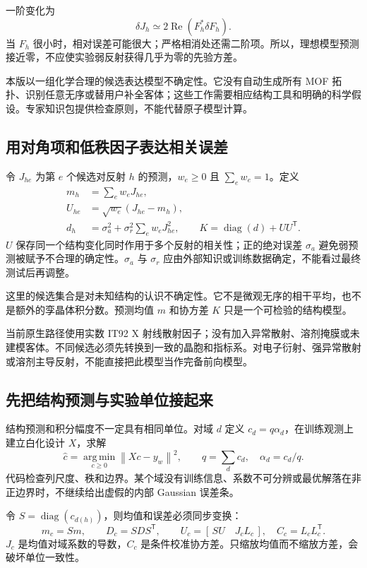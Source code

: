 \documentclass[UTF8,11pt,a4paper,fontset=fandol]{ctexart}
\newcommand{\T}{^{\mathsf T}}
\newcommand{\diag}{\operatorname{diag}}
\newcommand{\norm}[1]{\left\lVert#1\right\rVert}
\newcommand{\argmin}{\operatorname*{arg\,min}}
\begin{document}
一阶变化为
\begin{equation}
 \delta J_h\simeq 2\operatorname{Re}(F_h^*\delta F_h).
\end{equation}
当 $F_h$ 很小时，相对误差可能很大；严格相消处还需二阶项。所以，理想模型预测接近零，不应使实验弱反射获得几乎为零的先验方差。

本版以一组化学合理的候选表达模型不确定性。它没有自动生成所有 MOF 拓扑、识别任意无序或替用户补全客体；这些工作需要相应结构工具和明确的科学假设。专家知识包提供检查原则，不能代替原子模型计算。

\subsection{用对角项和低秩因子表达相关误差}

令 $J_{he}$ 为第 $e$ 个候选对反射 $h$ 的预测，$w_e\geq0$ 且 $\sum_e w_e=1$。定义
\begin{align}
 m_h&=\sum_e w_eJ_{he},\\
 U_{he}&=\sqrt{w_e}(J_{he}-m_h),\\
 d_h&=\sigma_a^2+\sigma_r^2\sum_e w_eJ_{he}^2,\qquad
 K=\diag(d)+UU\T.
\end{align}
$U$ 保存同一个结构变化同时作用于多个反射的相关性；正的绝对误差 $\sigma_a$ 避免弱预测被赋予不合理的确定性。$\sigma_a$ 与 $\sigma_r$ 应由外部知识或训练数据确定，不能看过最终测试后再调整。

这里的候选集合是对未知结构的认识不确定性。它不是微观无序的相干平均，也不是额外的孪晶体积分数。预测均值 $m$ 和协方差 $K$ 只是一个可检验的结构模型。

当前原生路径使用实数 IT92 X 射线散射因子；没有加入异常散射、溶剂掩膜或未建模客体。不同候选必须先转换到一致的晶胞和指标系。对电子衍射、强异常散射或溶剂主导反射，不能直接把此模型当作完备前向模型。

\subsection{先把结构预测与实验单位接起来}

结构预测和积分幅度不一定具有相同单位。对域 $d$ 定义 $c_d=q\alpha_d$，在训练观测上建立白化设计 $X$，求解
\begin{equation}
 \widehat c=\argmin_{c\geq0}\norm{Xc-y_w}^2,\qquad
 q=\sum_dc_d,\quad\alpha_d=c_d/q.
\end{equation}
代码检查列尺度、秩和边界。某个域没有训练信息、系数不可分辨或最优解落在非正边界时，不继续给出虚假的内部 Gaussian 误差条。

令 $S=\diag(c_{d(h)})$，则均值和误差必须同步变换：
\begin{equation}
 m_c=Sm,\qquad D_c=SDS\T,\qquad
 U_c=[\,SU\quad J_cL_c\,],\quad C_c=L_cL_c\T.
\end{equation}
$J_c$ 是均值对域系数的导数，$C_c$ 是条件校准协方差。只缩放均值而不缩放方差，会破坏单位一致性。
\end{document}
